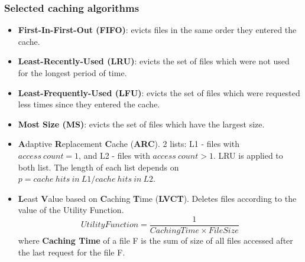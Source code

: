 \documentclass{beamer}
\begin{document}
\begin{frame}\frametitle{Selected caching algorithms}
\begin{footnotesize}
\begin{itemize}
\item \textbf{First-In-First-Out (FIFO)}: evicts files in the same order they entered the cache.
\item\textbf{Least-Recently-Used (LRU)}: evicts the set of files which were not used for the longest period of time.

\item \textbf{Least-Frequently-Used (LFU)}: evicts the set of files which were requested less times since they entered the cache.

\item \textbf{Most Size (MS)}: evicts the set of files which have the largest size.

\item \textbf{A}daptive \textbf{R}eplacement \textbf{C}ache (\textbf{ARC}). 2 lists: L1 - files with $access~count=1$, and L2 - files with $access~count>1$. LRU is applied to both list. The length of each list depends on $p = cache~hits~in~L1 / cache~hits~in~L2$.


\item \textbf{L}east \textbf{V}alue based on \textbf{C}aching \textbf{T}ime (\textbf{LVCT}).
Deletes files according to the value of the  Utility Function.
\begin{equation}
Utility Function = \frac{1}{Caching Time \times File Size}
\end{equation}   
where \textbf{Caching Time} of a file F is the sum of size of all files accessed after the last request for the file F.

\end{itemize}
\end{footnotesize}
\end{frame}
\end{document}
